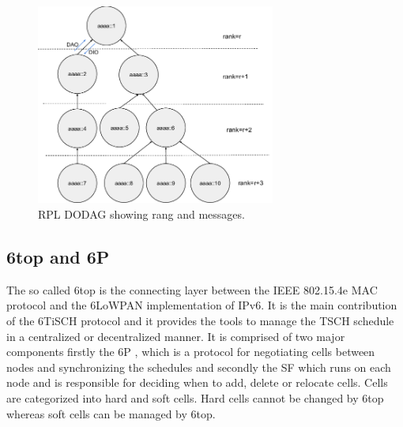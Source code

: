 \documentclass{comnets-thesis}
\begin{document}
\begin{figure}[H]
    \centering
    \includegraphics[width=0.7\textwidth]{./images/rpl dodag.png}
    \caption{RPL DODAG showing rang and messages. \cite{rpldodag}}
    \label{fig:rpl-dodag}
\end{figure}



\subsection{\acf{6top} and \acf{6P}}
The so called \ac{6top} \cite{RFC8480} is the connecting layer between the IEEE 802.15.4e MAC protocol and the 6LoWPAN implementation of IPv6. It is the main contribution of the \ac{6TiSCH} protocol and it provides the tools to manage the \ac{TSCH} schedule in a centralized or decentralized manner. It is comprised of two major components firstly the \acf{6P} \cite{RFC8480}, which is a protocol for negotiating cells between nodes and synchronizing the schedules and secondly the \ac{SF} which runs on each node and is responsible for deciding when to add, delete or relocate cells. Cells are categorized into hard and soft cells. Hard cells cannot be changed by \ac{6top} whereas soft cells can be managed by \ac{6top}.
\end{document}
